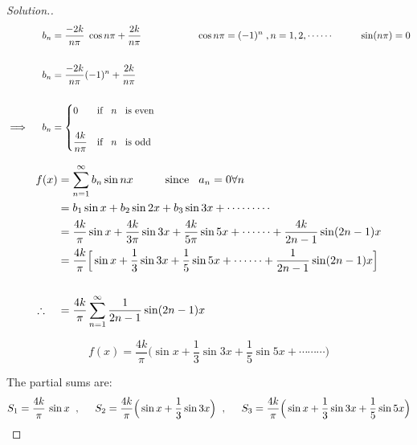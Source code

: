 \documentclass[11pt,a4paper]{article}
\theoremstyle{definition}
\newenvironment{solution}
  {\renewcommand{\qedsymbol}{}\begin{proof}[\textit{Solution}.]}
  {\end{proof}}
\begin{document}
\begin{solution}
\begin{align*}
b_n & = \frac{-2k}{n\pi}\hspace{0.1cm}\cos n \pi + \frac{2k}{n\pi}\hspace{2cm} \cos n \pi = (-1)^n \hspace{0.1cm} , n = 1,2,\cdots\cdots\hspace{1cm} \sin (n\pi) = 0\\\\
b_n & = \frac{-2k}{n\pi}(-1)^n + \frac{2k}{n\pi}\\\\
\implies \hspace{0.4cm} b_n & = 
\begin{cases}
0 & \text{if}\hspace{0.3cm}n \hspace{0.3cm} \text{is even}\\\\
\dfrac{4k}{n\pi} & \text{if}\hspace{0.3cm}n \hspace{0.3cm} \text{is odd}\\ 
\end{cases}\\
\end{align*}

\begin{align*}
f(x) & =  \sum^{\infty}_{n=1} b_n \sin nx \hspace{1cm} \text{since}\hspace{0.3cm} a_n = 0 \forall n\\
& = b_1 \sin x + b_2 \sin 2x + b_3 \sin 3x + \cdots\cdots\cdots\\
& = \frac{4k}{\pi}\sin x + \frac{4k}{3\pi}\sin 3x + \frac{4k}{5\pi}\sin 5x + \cdots\cdots + \frac{4k}{2n -1}\sin (2n-1)x\\
& = \frac{4k}{\pi}\Big[\sin x + \frac{1}{3}\sin 3x + \frac{1}{5}\sin 5x + \cdots\cdots + \frac{1}{2n -1}\sin (2n-1)x\Big]\\\\
\therefore \hspace{0.4cm} & = \frac{4k}{\pi} \sum^{\infty}_{n=1} \frac{1}{2n -1}\sin (2n-1)x\\
\end{align*}

$$f(x) = \frac{4k}{\pi}\Big(\sin x + \frac{1}{3}\sin 3x + \frac{1}{5}\sin 5x + \cdots\cdots \cdots\Big)$$ 

The partial sums are:
$$S_1 = \frac{4k}{\pi}\, \sin x\hspace{0.2cm}, \hspace{0.5cm} S_2 = \frac{4k}{\pi}\Big(\sin x + \frac{1}{3}\sin 3x\Big)\hspace{0.2cm},\hspace{0.5cm} S_3 = \frac{4k}{\pi}\Big( \sin x+ \frac{1}{3}\sin 3x + \frac{1}{5}\sin 5x\Big)$$


\end{solution}
\end{document}
